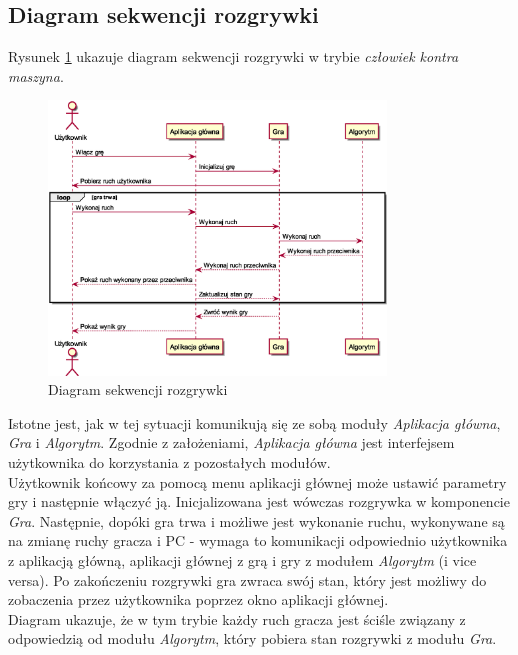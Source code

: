 \documentclass{article}
\newcommand{\modulename}[1]{\textit{#1}}
\begin{document}
\subsection{Diagram sekwencji rozgrywki}
Rysunek \ref{rys:sequencegame} ukazuje diagram sekwencji rozgrywki w trybie \modulename{człowiek kontra maszyna}.
\begin{figure}[h]
	\centering
	\includegraphics[width=0.8\textwidth]{play_with_pc_sequence}
	\caption{Diagram sekwencji rozgrywki}
	\label{rys:sequencegame}
\end{figure}

\noindent Istotne jest, jak w tej sytuacji komunikują się ze sobą moduły \modulename{Aplikacja główna}, \modulename{Gra} i \modulename{Algorytm}. Zgodnie z założeniami, \modulename{Aplikacja główna} jest interfejsem użytkownika do korzystania z pozostałych modułów.\\

\noindent Użytkownik końcowy za pomocą menu aplikacji głównej może ustawić parametry gry i następnie włączyć ją. Inicjalizowana jest wówczas rozgrywka w komponencie \textit{Gra}. Następnie, dopóki gra trwa i możliwe jest wykonanie ruchu, wykonywane są na zmianę ruchy gracza i PC - wymaga to komunikacji odpowiednio użytkownika z aplikacją główną, aplikacji głównej z grą i gry z modułem \modulename{Algorytm} (i vice versa). Po zakończeniu rozgrywki gra zwraca swój stan, który jest możliwy do zobaczenia przez użytkownika poprzez okno aplikacji głównej.\\

\noindent Diagram ukazuje, że w tym trybie każdy ruch gracza jest ściśle związany z odpowiedzią od modułu \modulename{Algorytm}, który pobiera stan rozgrywki z modułu \modulename{Gra}.
\end{document}
